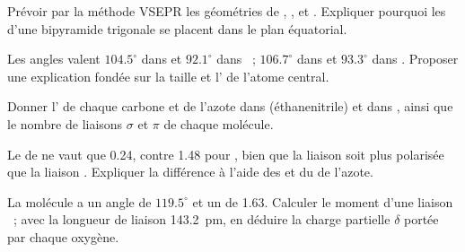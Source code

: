 \begin{exercise}[$\star\star$]\label{exo:b1:lewis-resonance-vsepr:7}
Prévoir par la méthode VSEPR les géométries de , ,
 et . Expliquer pourquoi les  d'une
bipyramide trigonale se placent dans le plan équatorial.
\end{exercise}

\begin{exercise}[$\star\star$]\label{exo:b1:lewis-resonance-vsepr:8}
Les angles  valent $104.5^\circ$ dans  et $92.1^\circ$
dans ~; $106.7^\circ$ dans  et $93.3^\circ$ dans
. Proposer une explication fondée sur la taille et
l' de l'atome central.
\end{exercise}

\begin{exercise}[$\star\star$]\label{exo:b1:lewis-resonance-vsepr:9}
Donner l' de chaque carbone et de l'azote dans 
(éthanenitrile) et dans , ainsi que le nombre de liaisons
$\sigma$ et $\pi$ de chaque molécule.
\end{exercise}

\begin{exercise}[$\star\star\star$]\label{exo:b1:lewis-resonance-vsepr:10}
Le  de  ne vaut que \qty{0.24}{\debye}, contre
\qty{1.48}{\debye} pour , bien que la liaison  soit plus
polarisée que la liaison . Expliquer la différence à l'aide des
 et du  de l'azote.
\end{exercise}

\begin{exercise}[$\star\star\star$]\label{exo:b1:lewis-resonance-vsepr:11}
La molécule  a un angle de $119.5^\circ$ et un 
de \qty{1.63}{\debye}. Calculer le moment d'une liaison ~; avec
la longueur de liaison \qty{143.2}{pm}, en déduire la charge partielle
$\delta$ portée par chaque oxygène.
\end{exercise}

